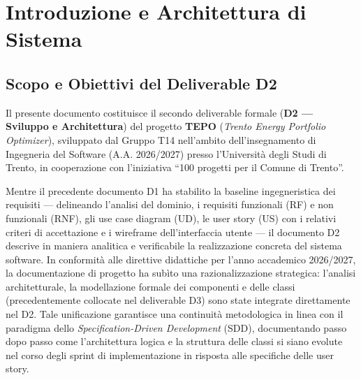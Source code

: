 \section{Introduzione e Architettura di Sistema}
\label{sec:introduzione_architettura}

\subsection{Scopo e Obiettivi del Deliverable D2}
Il presente documento costituisce il secondo deliverable formale (\textbf{D2 --- Sviluppo e Architettura}) del progetto \textbf{TEPO} (\emph{Trento Energy Portfolio Optimizer}), sviluppato dal Gruppo T14 nell'ambito dell'insegnamento di Ingegneria del Software (A.A. 2026/2027) presso l'Università degli Studi di Trento, in cooperazione con l'iniziativa ``100 progetti per il Comune di Trento''.

Mentre il precedente documento D1 ha stabilito la baseline ingegneristica dei requisiti --- delineando l'analisi del dominio, i requisiti funzionali (RF) e non funzionali (RNF), gli use case diagram (UD), le user story (US) con i relativi criteri di accettazione e i wireframe dell'interfaccia utente --- il documento D2 descrive in maniera analitica e verificabile la realizzazione concreta del sistema software.
In conformità alle direttive didattiche per l'anno accademico 2026/2027, la documentazione di progetto ha subìto una razionalizzazione strategica: l'analisi architetturale, la modellazione formale dei componenti e delle classi (precedentemente collocate nel deliverable D3) sono state integrate direttamente nel D2. Tale unificazione garantisce una continuità metodologica in linea con il paradigma dello \emph{Specification-Driven Development} (SDD), documentando passo dopo passo come l'architettura logica e la struttura delle classi si siano evolute nel corso degli sprint di implementazione in risposta alle specifiche delle user story.

